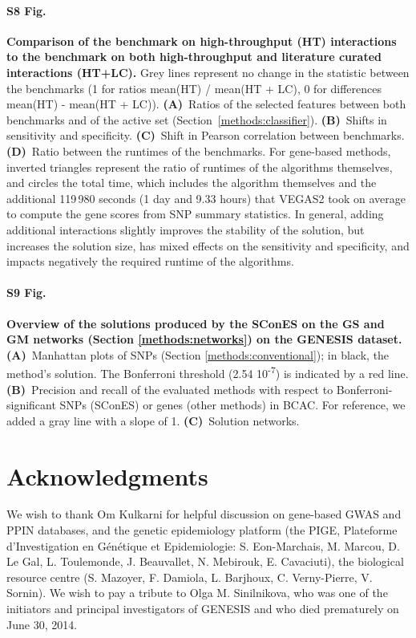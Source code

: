 \documentclass[10pt,letterpaper]{article}
\begin{document}
\paragraph*{S8 Fig.}
\label{sfig:lc_ht_comparison}
{\bf Comparison of the benchmark on high-throughput (HT) interactions to the benchmark on both high-throughput and literature curated interactions (HT+LC). } Grey lines represent no change in the statistic between the benchmarks (1 for ratios mean(HT) / mean(HT + LC), 0 for differences mean(HT) - mean(HT + LC)). \textbf{(A)}~Ratios of the selected features between both benchmarks and of the active set (Section~\ref{methods:classifier}). \textbf{(B)}~Shifts in sensitivity and specificity. \textbf{(C)}~Shift in Pearson correlation between benchmarks. \textbf{(D)}~Ratio between the runtimes of the benchmarks. For gene-based methods, inverted triangles represent the ratio of runtimes of the algorithms themselves, and circles the total time, which includes the algorithm themselves and the additional 119\,980 seconds (1 day and 9.33 hours) that VEGAS2 took on average to compute the gene scores from SNP summary statistics. In general, adding additional interactions slightly improves the stability of the solution, but increases the solution size, has mixed effects on the sensitivity and specificity, and impacts negatively the required runtime of the algorithms.
  
\paragraph*{S9 Fig.}
\label{sfig:scones_gsm}
{\bf Overview of the solutions produced by the SConES on the GS and GM networks (Section \ref{methods:networks}) on the GENESIS dataset.} \textbf{(A)}~Manhattan plots of SNPs (Section \ref{methods:conventional}); in black, the method’s solution. The Bonferroni threshold (2.54 \texttimes{} 10\textsuperscript{-7}) is indicated by a red line. \textbf{(B)}~Precision and recall of the evaluated methods with respect to Bonferroni-significant SNPs (SConES) or genes (other methods) in BCAC. For reference, we added a gray line with a slope of 1. \textbf{(C)}~Solution networks.

\section*{Acknowledgments}

We wish to thank Om Kulkarni for helpful discussion on gene-based GWAS and PPIN databases, and the genetic epidemiology platform (the PIGE, Plateforme d'Investigation en Génétique et Epidemiologie: S. Eon-Marchais, M. Marcou, D. Le Gal, L. Toulemonde, J. Beauvallet, N. Mebirouk, E. Cavaciuti), the biological resource centre (S. Mazoyer, F. Damiola, L. Barjhoux, C. Verny-Pierre, V. Sornin). We wish to pay a tribute to Olga M. Sinilnikova, who was one of the initiators and principal investigators of GENESIS and who died prematurely on June 30, 2014.
\end{document}

